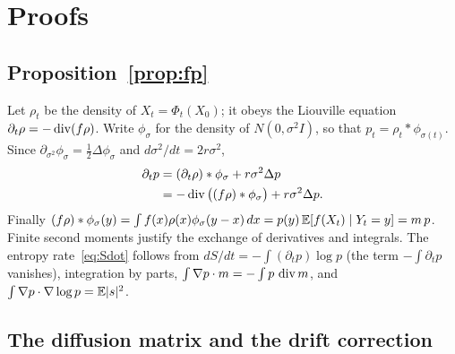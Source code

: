 \section{Proofs}
\label{app:proofs}

\subsection{Proposition~\ref{prop:fp}}
\label{app:fp}

Let $\rho_t$ be the density of $X_t = \Phi_t(X_0)$; it obeys the Liouville equation $\partial_t\rho = -\operatorname{div}(f\rho)$. Write $\phi_\sigma$ for the density of $N(0,\sigma^2 I)$, so that $p_t = \rho_t * \phi_{\sigma(t)}$. Since $\partial_{\sigma^2}\phi_\sigma = \tfrac12\Delta\phi_\sigma$ and $d\sigma^2/dt = 2r\sigma^2$,
\begin{align}
\partial_t p &= (\partial_t\rho) * \phi_\sigma + r\sigma^2\Delta p \nonumber\\
&= -\operatorname{div}\big((f\rho)*\phi_\sigma\big) + r\sigma^2\Delta p .
\end{align}
Finally $(f\rho)*\phi_\sigma(y) = \int f(x)\rho(x)\phi_\sigma(y - x)\,dx = p(y)\,\mathbb{E}[f(X_t)\mid Y_t = y] = m\,p$. Finite second moments justify the exchange of derivatives and integrals. The entropy rate~\eqref{eq:Sdot} follows from $dS/dt = -\int (\partial_t p)\log p$ (the term $-\int\partial_t p$ vanishes), integration by parts, $\int\nabla p\cdot m = -\int p\,\operatorname{div} m$, and $\int \nabla p \cdot \nabla \log p = \mathbb{E}|s|^2$.

\subsection{The diffusion matrix and the drift correction}
\label{app:sde}

